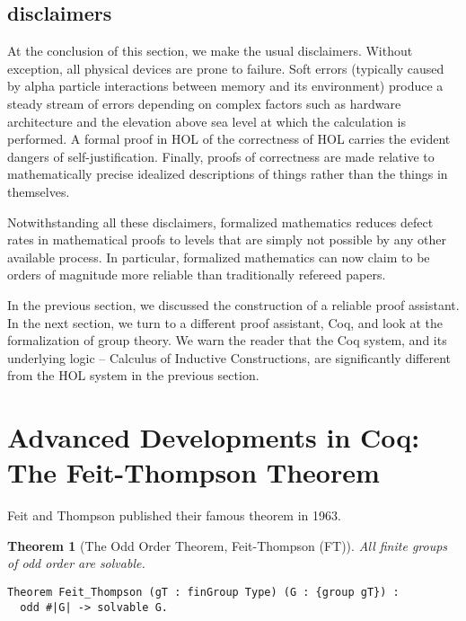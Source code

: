 \documentclass[brochure,english,12pt]{bourbaki}
\theoremstyle{plain}
\newtheorem{theorem}[equation]{Theorem}
\begin{document}
\bigskip


\subsection{disclaimers}

At the conclusion of this section, we make the usual disclaimers.
Without exception, all physical devices are prone to failure.  Soft errors (typically 
caused by alpha particle interactions between memory and its environment) 
produce a steady
stream of errors depending on complex factors such as hardware architecture and
the elevation above sea level at which the
calculation is performed.  A formal proof in HOL of the correctness of HOL carries
the evident dangers of self-justification.  Finally, proofs of correctness are made relative to 
mathematically precise idealized descriptions of things rather than the things
in themselves.

Notwithstanding all these disclaimers,  formalized mathematics reduces defect rates
in mathematical proofs to levels that are simply not possible by any other available process.
In particular, formalized mathematics can now claim to be orders of magnitude more reliable than 
traditionally refereed papers.  


In the previous section, we discussed the construction of a reliable proof assistant.  In the next section,
we turn to a different proof assistant, Coq, and look at the formalization of group theory.
We warn the reader that the Coq system, and its underlying logic -- Calculus of Inductive Constructions, 
are significantly different from the HOL system in the previous section.


\section{Advanced Developments in Coq: The Feit-Thompson Theorem}


Feit and Thompson published their famous theorem in 1963.

\begin{theorem}[The Odd Order Theorem, Feit-Thompson (FT)]  All finite groups of odd order are solvable.
\end{theorem}

\begin{lstlisting}[keepspaces=true,stringstyle=\tt,basicstyle=\small,frame=single,framesep=8pt,mathescape,morekeywords={Theorem},columns=flexible]
Theorem Feit_Thompson (gT : finGroup Type) (G : {group gT}) :
  odd #|G| -> solvable G.
\end{lstlisting}
\end{document}
